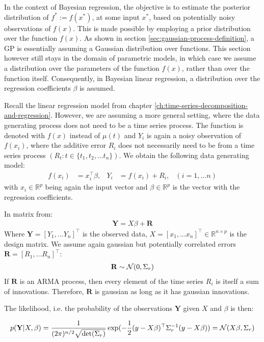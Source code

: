 In the context of Bayesian regression, the objective is to estimate the posterior distribution of
$f^{\ast} := f(x^{\ast})$, at some input $x^{\ast}$, based on potentially noisy observations of $f(x)$.
This is made possible by employing a prior distribution
over the function $f(x)$.
As shown in section \ref{sec:gaussian-process-definition}, a GP is essentially
assuming a Gaussian distribution over functions.
This section however still stays in the domain of parametric models,
in which case we assume a distribution over the parameters of the function $f(x)$,
rather than over the function itself.
Consequently, in Bayesian linear regression, a distribution over the regression coefficients $\beta$ is assumed.


Recall the linear regression model from chapter \ref{ch:time-series-decomposition-and-regression}.
However, we are assuming a more general setting, where the data generating process does not need to be a time series process.
The function is denoted with $f(x)$ instead of $\mu(t)$ and $Y_i$ is again a noisy observation of
$f(x_i)$, where the additive error $R_i$ does not necessarily need to be from a time series process $(R_t: t \in \{t_1, t_2, \dots  t_n \})$.
We obtain the following data generating model:
\begin{align*}
    f(x_i) &= x_i^{\top}\beta, & Y_i &= f(x_i) + R_i,  & (i = 1, \dots n)
\end{align*}
with $x_i \in \mathbb{R}^p$ being again the input vector and $\beta \in \mathbb{R}^p$ is the vector with
the regression coefficients.

In matrix from:
\begin{align*}
    \mathbf{Y} = X \beta + \mathbf{R}
\end{align*}
Where $\mathbf{Y} = [Y_{1}, \dots Y_{n}]^{\top}$ is the observed data,
$X = [x_{1}, \dots x_{n}]^{\top} \in \mathbb{R}^{n \times p}$ is the design matrix.
We assume again gaussian but potentially correlated errors $\mathbf{R} = [R_{1}, \dots R_{n}]^{\top}$:
\begin{gather*}
    \mathbf{R} \sim \operatorname{\mathcal{N}}(0, \Sigma_r)
\end{gather*}
If $\mathbf{R}$ is an ARMA process, then every element of the time series $R_{i}$
is itself a sum of innovations.
Therefore, $\mathbf{R}$ is gaussian as long as it has gaussian innovations.

The likelihood, i.e. the probability of the observations $\mathbf{Y}$ given $X$ and $\beta$ is then:

\begin{gather*}
    p(\mathbf{Y}|X,\beta)
    = \frac{1}{(2\pi)^{n/2} \sqrt {\det(\Sigma_r)}}
    \exp(-\frac{1}{2}(y - X\beta)^{\top} \Sigma_r^{-1}(y-X\beta))
    = \operatorname{\mathcal{N}}(X \beta, \Sigma_r)
\end{gather*}

